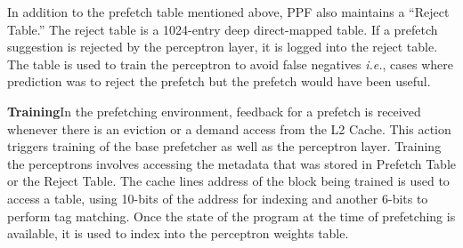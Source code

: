 %
%
%


In addition to the prefetch table mentioned above, PPF also maintains
a ``Reject Table.''  The reject table is a 1024-entry deep
direct-mapped table.  If a prefetch suggestion is rejected by the
perceptron layer, it is logged into the reject table.  The table is
used to train the perceptron to %
avoid false negatives \textit{i.e.}, cases where prediction was to
reject the prefetch but the prefetch would have been useful.



\textbf{Training}\newline In the prefetching environment, feedback for
a prefetch is received whenever there is an eviction or a demand
access from the L2 Cache.  This action triggers training of the base
prefetcher as well as the perceptron layer.  Training the perceptrons
involves accessing the metadata that was stored in Prefetch Table or
the Reject Table.  The cache lines address of the block being trained
is used to access a table, using 10-bits of the address for indexing
and another 6-bits to perform tag matching.  Once the state of the
program at the time of prefetching is available, it is
used to index into the perceptron weights table.

